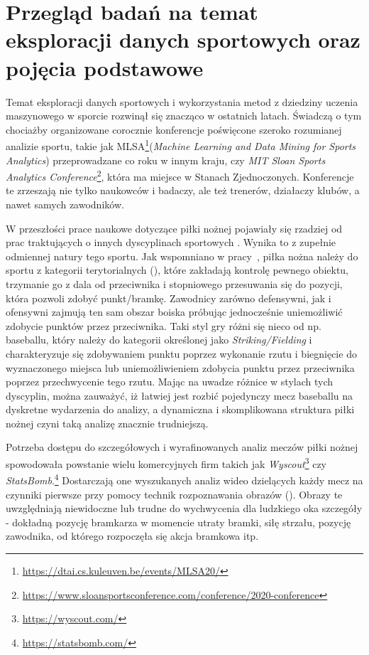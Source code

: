 
\chapter{Przegląd badań na temat eksploracji danych sportowych oraz pojęcia podstawowe}
\noindent Temat eksploracji danych sportowych i wykorzystania metod z dziedziny uczenia maszynowego w sporcie rozwinął się znacząco w ostatnich latach. Świadczą o tym chociażby organizowane corocznie konferencje poświęcone szeroko rozumianej analizie sportu, takie jak MLSA\footnote{\url{https://dtai.cs.kuleuven.be/events/MLSA20/}}(\textit{Machine Learning and Data Mining for Sports Analytics}) przeprowadzane co roku w innym kraju, czy \textit{MIT Sloan Sports Analytics Conference}\footnote{\url{https://www.sloansportsconference.com/conference/2020-conference}}, która ma miejsce w Stanach Zjednoczonych. Konferencje te zrzeszają nie tylko naukowców i badaczy, ale też trenerów, działaczy klubów, a nawet samych zawodników.

W przeszłości prace naukowe dotyczące piłki nożnej pojawiały się rzadziej od prac traktujących o innych dyscyplinach sportowych \cite{ml_soccer_analytics}. Wynika to z zupełnie odmiennej natury tego sportu. Jak wspomniano w pracy~\cite{game_classification}, piłka nożna należy do sportu z kategorii terytorialnych (), które zakładają kontrolę pewnego obiektu, trzymanie go z dala od przeciwnika i stopniowego przesuwania się do pozycji, która pozwoli zdobyć punkt/bramkę. Zawodnicy zarówno defensywni, jak i ofensywni zajmują ten sam obszar boiska próbując jednocześnie uniemożliwić zdobycie punktów przez przeciwnika. Taki styl gry różni się nieco od np. baseballu, który należy do kategorii określonej jako \textit{Striking/Fielding} i charakteryzuje się zdobywaniem punktu poprzez wykonanie rzutu i biegnięcie do wyznaczonego miejsca lub uniemożliwieniem zdobycia punktu przez przeciwnika poprzez przechwycenie tego rzutu. Mając na uwadze różnice w stylach tych dyscyplin, można zauważyć, iż łatwiej jest rozbić pojedynczy mecz baseballu na dyskretne wydarzenia do analizy, a dynamiczna i skomplikowana struktura piłki nożnej czyni taką analizę znacznie trudniejszą.

Potrzeba dostępu do szczegółowych i wyrafinowanych analiz meczów piłki nożnej spowodowała powstanie wielu komercyjnych firm takich jak \textit{Wyscout}\footnote{\url{https://wyscout.com/}} czy \textit{StatsBomb}.\footnote{\url{https://statsbomb.com/}} Dostarczają one wyszukanych analiz wideo dzielących każdy mecz na czynniki pierwsze przy pomocy technik rozpoznawania obrazów (). Obrazy te uwzględniają niewidoczne lub trudne do wychwycenia dla ludzkiego oka szczegóły - dokładną pozycję bramkarza w momencie utraty bramki, siłę strzału, pozycję zawodnika, od którego rozpoczęła się akcja bramkowa itp.

